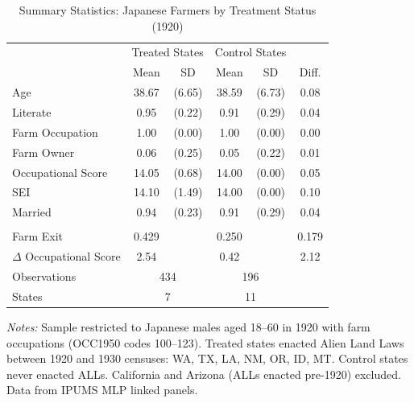 \begin{table}[htbp]
\centering
\caption{Summary Statistics: Japanese Farmers by Treatment Status (1920)}
\label{tab:summary}
\begin{tabular}{lccccc}
\hline\hline
 & \multicolumn{2}{c}{Treated States} & \multicolumn{2}{c}{Control States} & \\
 & Mean & SD & Mean & SD & Diff. \\
\hline
Age & 38.67 & (6.65) & 38.59 & (6.73) & 0.08 \\
Literate & 0.95 & (0.22) & 0.91 & (0.29) & 0.04 \\
Farm Occupation & 1.00 & (0.00) & 1.00 & (0.00) & 0.00 \\
Farm Owner & 0.06 & (0.25) & 0.05 & (0.22) & 0.01 \\
Occupational Score & 14.05 & (0.68) & 14.00 & (0.00) & 0.05 \\
SEI & 14.10 & (1.49) & 14.00 & (0.00) & 0.10 \\
Married & 0.94 & (0.23) & 0.91 & (0.29) & 0.04 \\
\addlinespace
\multicolumn{6}{l}{\textit{Outcomes (1920--1930 Change)}} \\
Farm Exit & 0.429 & & 0.250 & & 0.179 \\
$\Delta$ Occupational Score & 2.54 & & 0.42 & & 2.12 \\
\hline
Observations & \multicolumn{2}{c}{434} & \multicolumn{2}{c}{196} & \\
States & \multicolumn{2}{c}{7} & \multicolumn{2}{c}{11} & \\
\hline\hline
\end{tabular}
\begin{tablenotes}
\item \textit{Notes:} Sample restricted to Japanese males aged 18--60 in 1920 with farm occupations (OCC1950 codes 100--123). Treated states enacted Alien Land Laws between 1920 and 1930 censuses: WA, TX, LA, NM, OR, ID, MT. Control states never enacted ALLs. California and Arizona (ALLs enacted pre-1920) excluded. Data from IPUMS MLP linked panels.
\end{tablenotes}
\end{table}
